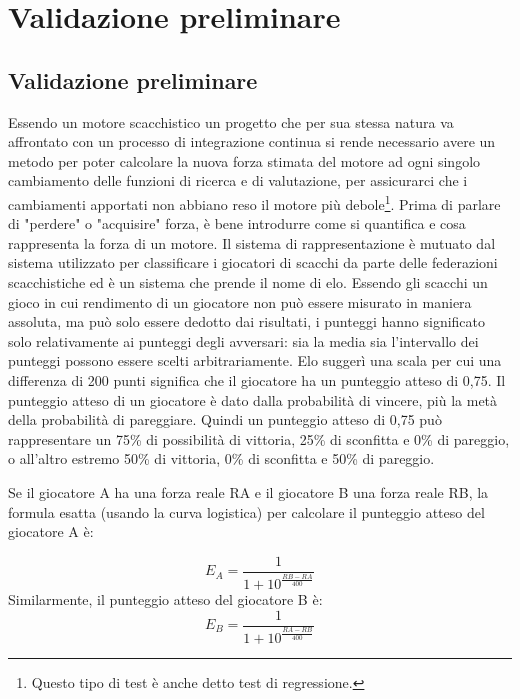 \chapter{Validazione preliminare} %
%

\section*{Validazione preliminare}
Essendo un motore scacchistico un progetto che per sua stessa natura va affrontato con un processo di integrazione continua si rende necessario avere un metodo 
per poter calcolare la nuova forza stimata del motore  ad ogni singolo cambiamento  delle funzioni di ricerca e di valutazione, per assicurarci che i cambiamenti apportati non abbiano reso il motore più debole\footnote{Questo tipo di test è anche detto test di regressione.}.
Prima di parlare di "perdere" o "acquisire" forza, è bene introdurre come si quantifica e cosa rappresenta la forza di un motore. Il sistema di rappresentazione è mutuato dal sistema utilizzato per classificare i 
giocatori di scacchi da parte delle federazioni scacchistiche ed è un sistema che prende il nome di elo. Essendo gli scacchi un gioco in cui  rendimento di un giocatore non può essere misurato in maniera assoluta,
ma può solo essere dedotto dai risultati, i punteggi hanno significato solo relativamente ai punteggi degli avversari: 
sia la media sia l'intervallo dei punteggi possono essere scelti arbitrariamente. Elo suggerì una scala per cui una differenza di 200 punti significa che il giocatore ha un punteggio atteso di 0,75.
Il punteggio atteso di un giocatore è dato dalla probabilità di vincere, più la metà della probabilità di pareggiare. Quindi un punteggio atteso di 0,75 può rappresentare un 75\% di possibilità di vittoria, 
25\% di sconfitta e 0\% di pareggio, o all'altro estremo 50\% di vittoria, 0\% di sconfitta e 50\% di pareggio.

Se il giocatore A ha una forza reale RA e il giocatore B una forza reale RB, la formula esatta (usando la curva logistica) per calcolare il punteggio atteso del giocatore A è:

\begin{equation}  E_{A}={\frac{{1}}{{1+10^\frac{{{RB} - {RA}}}{{400}}}}} \end{equation}
Similarmente, il punteggio atteso del giocatore B è:
\begin{equation}  E_{B}={\frac{{1}}{{1+10^\frac{{{RA} - {RB}}}{{400}}}}} \end{equation}


